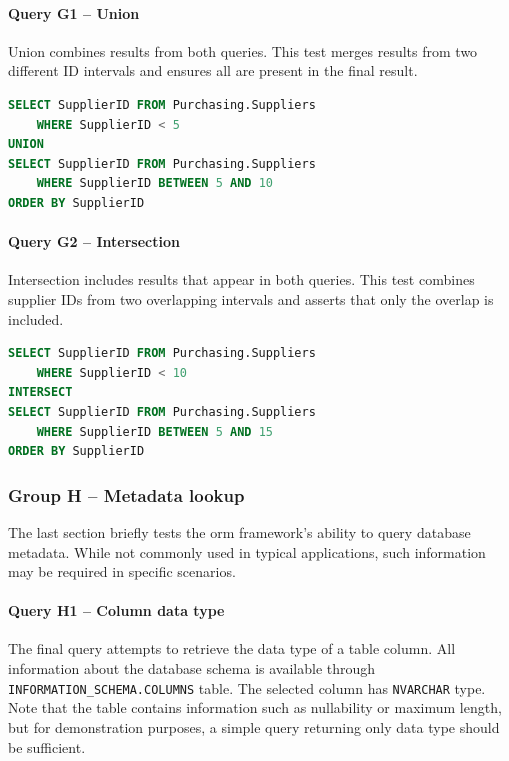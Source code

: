 \paragraph{Query G1 -- Union}
\label{query:g1}
Union combines results from both queries. This test merges results from two different ID intervals and ensures all are present in the final result.

\begin{lstlisting}[language=SQL]
SELECT SupplierID FROM Purchasing.Suppliers 
    WHERE SupplierID < 5
UNION
SELECT SupplierID FROM Purchasing.Suppliers 
    WHERE SupplierID BETWEEN 5 AND 10
ORDER BY SupplierID
\end{lstlisting}

\paragraph{Query G2 -- Intersection}
\label{query:g2}
Intersection includes results that appear in both queries. This test combines supplier IDs from two overlapping intervals and asserts that only the overlap is included. 

\begin{lstlisting}[language=SQL]
SELECT SupplierID FROM Purchasing.Suppliers 
    WHERE SupplierID < 10
INTERSECT
SELECT SupplierID FROM Purchasing.Suppliers 
    WHERE SupplierID BETWEEN 5 AND 15
ORDER BY SupplierID
\end{lstlisting}

\subsubsection{Group H -- Metadata lookup}
The last section briefly tests the \acrshort{orm} framework's ability to query database metadata. While not commonly used in typical applications, such information may be required in specific scenarios.

\paragraph{Query H1 -- Column data type}
\label{query:h1}
The final query attempts to retrieve the data type of a table column. All information about the database schema is available through \texttt{INFORMATION\_SCHEMA.COLUMNS} table. The selected column has \texttt{NVARCHAR} type. Note that the table contains information such as nullability or maximum length, but for demonstration purposes, a simple query returning only data type should be sufficient.

